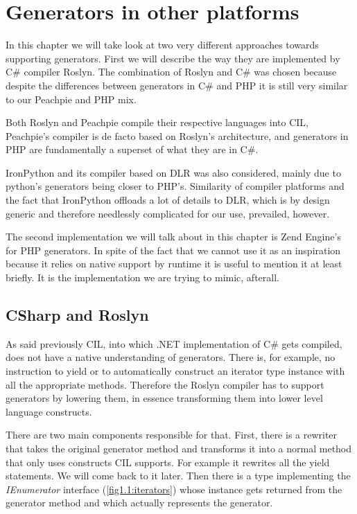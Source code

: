 \chapter{Generators in other platforms}

In this chapter we will take look at two very different approaches towards supporting generators. First we will describe the way they are implemented by C\# compiler Roslyn. The combination of Roslyn and C\# was chosen because despite the differences between generators in C\# and PHP it is still very similar to our Peachpie and PHP mix.

Both Roslyn and Peachpie compile their respective languages into CIL, Peachpie’s compiler is de facto based on Roslyn’s architecture, and generators in PHP are fundamentally a superset of what they are in C\#. 

IronPython and its compiler based on DLR was also considered, mainly due to python’s generators being closer to PHP’s. Similarity of compiler platforms and the fact that IronPython offloads a lot of details to DLR, which is by design generic and therefore needlessly complicated for our use, prevailed, however. 

The second implementation we will talk about in this chapter is Zend Engine’s for PHP generators. In spite of the fact that we cannot use it as an inspiration because it relies on native support by runtime it is useful to mention it at least briefly. It is the implementation we are trying to mimic, afterall.

\section{CSharp and Roslyn}

As said previously CIL, into which .NET implementation of C\# gets compiled, does not have a native understanding of generators. There is, for example, no instruction to yield or to automatically construct an iterator type instance with all the appropriate methods. Therefore the Roslyn compiler has to support generators by lowering them, in essence transforming them into lower level language constructs. 

There are two main components responsible for that. First, there is a rewriter that takes the original generator method and transforms it into a normal method that only uses constructs CIL supports. For example it rewrites all the yield statements. We will come back to it later. Then there is a type implementing the \emph{IEnumerator} interface (\autoref{fig1.1:iterators}) whose instance gets returned from the generator method and which actually represents the generator.


